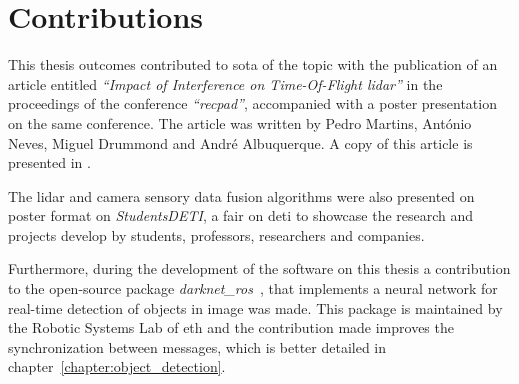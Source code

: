 \section{Contributions} \label{section:introduction:contributions}
This thesis outcomes contributed to \acl{sota} of the topic with the publication of an article entitled \textit{``Impact of Interference on Time-Of-Flight \acs{lidar}''} in the proceedings of the conference \textit{``\acl{recpad}''}, accompanied with a poster presentation on the same conference. The article was written by Pedro Martins, António Neves, Miguel Drummond and André Albuquerque. A copy of this article is presented in .

The \ac{lidar} and camera sensory data fusion algorithms were also presented on poster format on \textit{Students\@ DETI}, a fair on  \acl{deti} to showcase the research and projects develop by students, professors, researchers and companies.

Furthermore, during the development of the software on this thesis a contribution to the open-source package \textit{darknet\_ros}~\cite{MarkoBjelonic}, that implements a neural network for real-time detection of objects in image was made. This package is maintained by the Robotic Systems Lab of \acl{eth} and the contribution made improves the synchronization between messages, which is better detailed in chapter~\ref{chapter:object_detection}.

